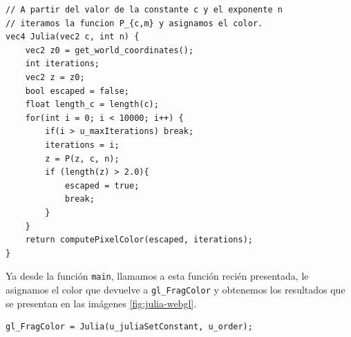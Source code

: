 \begin{lstlisting}
// A partir del valor de la constante c y el exponente n
// iteramos la funcion P_{c,m} y asignamos el color.
vec4 Julia(vec2 c, int n) {
    vec2 z0 = get_world_coordinates();
    int iterations;
    vec2 z = z0;
    bool escaped = false;
    float length_c = length(c);
    for(int i = 0; i < 10000; i++) {
        if(i > u_maxIterations) break;
        iterations = i;
        z = P(z, c, n);
        if (length(z) > 2.0){
            escaped = true;
            break;
        }
    }
    return computePixelColor(escaped, iterations);
}
\end{lstlisting}

Ya desde la función \verb|main|, llamamos a esta función recién presentada, le asignamos el color que devuelve a \verb|gl_FragColor| y obtenemos los resultados que se presentan en las imágenes \ref{fig:julia-webgl}.  

\begin{lstlisting}
gl_FragColor = Julia(u_juliaSetConstant, u_order);
\end{lstlisting}

